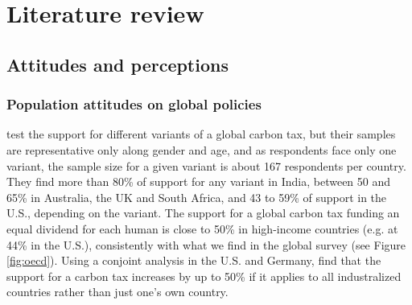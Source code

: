 \clearpage
\section{Literature review}\label{sec:literature}

\subsection{Attitudes and perceptions}\label{subsec:literature_attitudes}

\subsubsection{Population attitudes on global policies}\label{subsubsec:literature_attitudes_policies}
\citet{carattini_how_2019} test the support for different variants of a global carbon tax, but their samples are representative only along gender and age, and as respondents face only one variant, the sample size for a given variant is about 167 respondents per country. They find more than 80\% of support for any variant in India, between 50 and 65\% in Australia, the UK and South Africa, and 43 to 59\% of support in the U.S., depending on the variant. The support for a global carbon tax funding an equal dividend for each human is close to 50\% in high-income countries (e.g. at 44\% in the U.S.), consistently with what we find in the global survey (see Figure \ref{fig:oecd}). 
Using a conjoint analysis in the U.S. and Germany, \citet{beiser-mcgrath_could_2019} find that the support for a carbon tax increases by up to 50\% %
if it applies to all industralized countries rather than just one's own country. %

